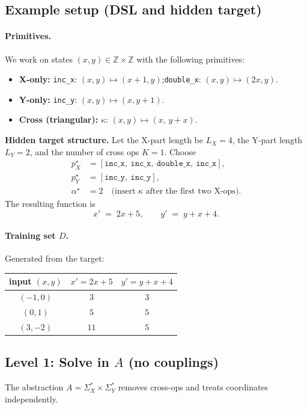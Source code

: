 \documentclass[11pt]{article}
\begin{document}
\subsection{Example setup (DSL and hidden target)}
\paragraph{Primitives.} We work on states $(x,y)\in\mathbb{Z}\times\mathbb{Z}$ with the following primitives:
\begin{itemize}
\item \textbf{X-only:} \texttt{inc\_x}: $(x,y)\mapsto(x+1,y)$;\quad \texttt{double\_x}: $(x,y)\mapsto(2x,y)$.
\item \textbf{Y-only:} \texttt{inc\_y}: $(x,y)\mapsto(x,y+1)$.
\item \textbf{Cross (triangular):} $\kappa$: $(x,y)\mapsto(x,\,y+x)$.
\end{itemize}

\noindent\textbf{Hidden target structure.}
Let the X-part length be $L_X=4$, the Y-part length $L_Y=2$, and the number of cross ops $K=1$.
Choose
\begin{align*}
p_X^\star &= [\texttt{inc\_x},\ \texttt{inc\_x},\ \texttt{double\_x},\ \texttt{inc\_x}],\\
p_Y^\star &= [\texttt{inc\_y},\ \texttt{inc\_y}],\\
\alpha^\star &= 2 \quad\text{(insert $\kappa$ after the first two X-ops).}
\end{align*}
The resulting function is
\begin{equation*}
x' \;=\; 2x+5,\qquad y' \;=\; y + x + 4.
\end{equation*}

\paragraph{Training set $D$.} Generated from the target:
\begin{center}
\begin{tabular}{c|cc}
input $(x,y)$ & $x'=2x+5$ & $y'=y+x+4$\\\hline
$(-1,0)$ & $3$ & $3$\\
$(0,1)$ & $5$ & $5$\\
$(3,-2)$ & $11$ & $5$\\
\end{tabular}
\end{center}

\subsection{Level 1: Solve in $A$ (no couplings)}
The abstraction $A=\Sigma_X^*\times\Sigma_Y^*$ removes cross-ops and treats coordinates independently.
\end{document}
